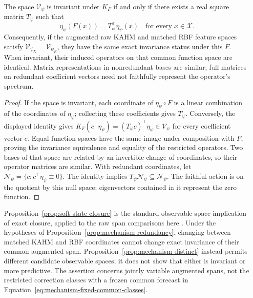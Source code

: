 \begin{proposition}
\label{prop:soft-state-closure}
The space $\mathcal V_\psi$ is invariant under $K_F$ if and only if
there exists a real square matrix $T_\psi$ such that
\[
 \eta_\psi(F(x))=T_\psi^\top\eta_\psi(x)
 \quad\text{for every }x\in\mathcal X.
\]
Consequently, if the augmented raw KAHM and matched RBF feature spaces
satisfy $\mathcal V_{\psi_K}=\mathcal V_{\psi_R}$, they have the same
exact invariance status under this $F$. When invariant, their induced
operators on that common function space are identical. Matrix
representations in nonredundant bases are similar; full matrices on
redundant coefficient vectors need not faithfully represent the
operator's spectrum.
\end{proposition}

\begin{proof}
If the space is invariant, each coordinate of $\eta_\psi\circ F$ is
a linear combination of the coordinates of $\eta_\psi$; collecting
these coefficients gives $T_\psi$. Conversely, the displayed identity
gives
$K_F(c^\top\eta_\psi)=(T_\psi c)^\top\eta_\psi\in\mathcal V_\psi$
for every coefficient vector $c$. Equal function spaces have the same
image under composition with $F$, proving the invariance equivalence
and equality of the restricted operators. Two bases of that space are
related by an invertible change of coordinates, so their operator
matrices are similar. With redundant coordinates, let
$\mathcal N_\psi=\{c:c^\top\eta_\psi\equiv0\}$.
The identity implies $T_\psi\mathcal N_\psi\subseteq\mathcal N_\psi$.
The faithful action is on the quotient by this null space; eigenvectors
contained in it represent the zero function.
\end{proof}

Proposition~\ref{prop:soft-state-closure} is the standard observable-space
implication of exact closure, applied to the raw span comparisons here
\citep{KumarKargaran2026Limits}. Under the hypotheses of
Proposition~\ref{prop:mechanism-redundancy}, changing between matched
KAHM and RBF coordinates cannot change exact invariance of their common
augmented span. Proposition~\ref{prop:mechanism-distinct} instead permits
different candidate observable spaces; it does not show that either is
invariant or more predictive. The assertion concerns jointly variable
augmented spans, not the restricted correction classes with a frozen
common forecast in Equation~\eqref{eq:mechanism-fixed-common-classes}.

